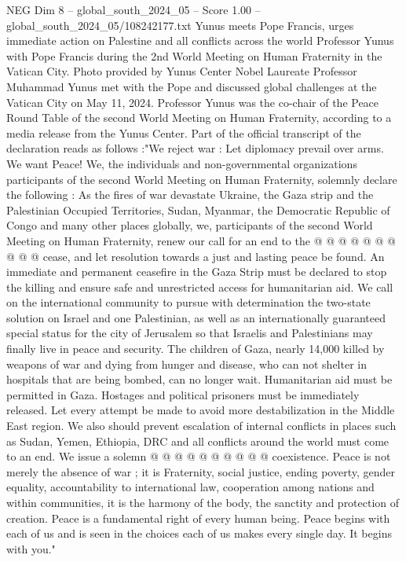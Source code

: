 \begin{textsample}{NEG Dim 8 – global\_south\_2024\_05 – Score 1.00 – global\_south\_2024\_05/108242177.txt}  \label{ex:f8_neg_236}
Yunus meets Pope Francis, urges immediate action on Palestine and all conflicts across the world Professor Yunus with Pope Francis during the 2nd World Meeting on Human Fraternity in the Vatican City.
Photo provided by Yunus Center Nobel Laureate Professor Muhammad Yunus met with the Pope and discussed global challenges at the Vatican City on May 11, 2024.
Professor Yunus was the co-chair of the Peace Round Table of the second World Meeting on Human Fraternity, according to a media release from the Yunus Center.
Part of the official transcript of the declaration reads as follows :"We reject war : Let diplomacy prevail over arms.
We want Peace!
We, the individuals and non-governmental organizations participants of the second World Meeting on Human Fraternity, solemnly declare the following : As the fires of war devastate Ukraine, the Gaza strip and the Palestinian Occupied Territories, Sudan, Myanmar, the Democratic Republic of Congo and many other places globally, we, participants of the second World Meeting on Human Fraternity, renew our call for an end to the @ @ @ @ @ @ @ @ @ @ cease, and let resolution towards a just and lasting peace be found.
An immediate and permanent ceasefire in the Gaza Strip must be declared to stop the killing and ensure safe and unrestricted access for humanitarian aid.
We call on the international community to pursue with determination the two-state solution on Israel and one Palestinian, as well as an internationally guaranteed special status for the city of Jerusalem so that Israelis and Palestinians may finally live in peace and security.
The children of Gaza, nearly 14,000 killed by weapons of war and dying from hunger and disease, who can not shelter in hospitals that are being bombed, can no longer wait.
Humanitarian aid must be permitted in Gaza.
Hostages and political prisoners must be immediately released.
Let every attempt be made to avoid more destabilization in the Middle East region.
We also should prevent escalation of internal conflicts in places such as Sudan, Yemen, Ethiopia, DRC and all conflicts around the world must come to an end.
We issue a solemn @ @ @ @ @ @ @ @ @ @ coexistence.
Peace is not merely the absence of war ; it is Fraternity, social justice, ending poverty, gender equality, accountability to international law, cooperation among nations and within communities, it is the harmony of the body, the sanctity and protection of creation.
Peace is a fundamental right of every human being.
Peace begins with each of us and is seen in the choices each of us makes every single day.
It begins with you."

\end{textsample}
